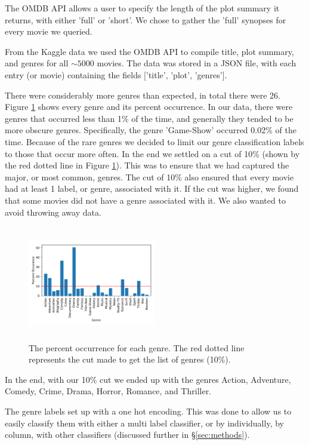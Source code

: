 \documentclass[11pt]{article}
\begin{document}
The OMDB API allows a user to specify the length of the plot summary it returns, with either 'full' or 'short'. We chose to gather the 'full' synopses for every movie we queried.

From the Kaggle data we used the OMDB API to compile title, plot summary, and genres for all $\sim5000$ movies. The data was stored in a JSON file, with each entry (or movie) containing the fields ['title', 'plot', 'genres'].

There were considerably more genres than expected, in total there were 26. Figure \ref{fig:genres} shows every genre and its percent occurrence. In our data, there were genres that occurred less than 1\% of the time, and generally they tended to be more obscure genres. Specifically, the genre 'Game-Show' occurred 0.02\% of the time. Because of the rare genres we decided to limit our genre classification labels to those that occur more often. In the end we settled on a cut of 10\% (shown by the red dotted line in Figure \ref{fig:genres}). This was to ensure that we had captured the major, or most common, genres. The cut of 10\% also ensured that every movie had at least 1 label, or genre, associated with it. If the cut was higher, we found that some movies did not have a genre associated with it. We also wanted to avoid throwing away data. 

\begin{figure}[ht]
	\centering
		\includegraphics[width=0.5\textwidth,height=5cm]{genres.pdf}
	\caption{The percent occurrence for each genre. The red dotted line represents the cut made to get the list of genres (10\%).}
	\label{fig:genres}
\end{figure}

In the end, with our 10\% cut we ended up with the genres Action, Adventure, Comedy, Crime, Drama, Horror, Romance, and Thriller.

The genre labels set up with a one hot encoding. This was done to allow us to easily classify them with either a multi label classifier, or by individually, by column, with other classifiers (discussed further in \S \ref{sec:methods}). 
\end{document}
